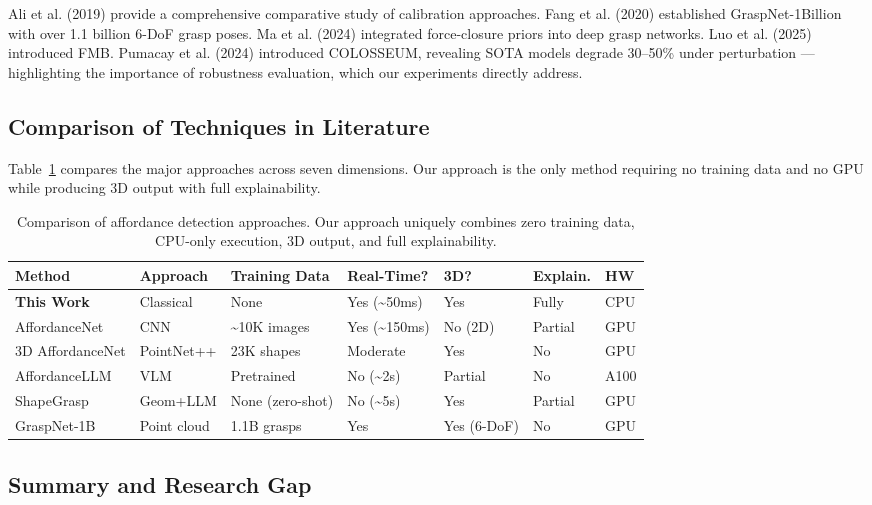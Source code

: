 \documentclass[11pt,a4paper]{article}
\begin{document}
Ali et al. (2019) provide a comprehensive comparative study of calibration approaches. Fang et al. (2020) established GraspNet-1Billion with over 1.1 billion 6-DoF grasp poses. Ma et al. (2024) integrated force-closure priors into deep grasp networks. Luo et al. (2025) introduced FMB. Pumacay et al. (2024) introduced COLOSSEUM, revealing SOTA models degrade 30--50\% under perturbation --- highlighting the importance of robustness evaluation, which our experiments directly address.

\subsection{Comparison of Techniques in Literature}

Table~\ref{tab:lit_comparison} compares the major approaches across seven dimensions. Our approach is the only method requiring no training data and no GPU while producing 3D output with full explainability.

\begin{table}[H]
\centering
\caption{Comparison of affordance detection approaches. Our approach uniquely combines zero training data, CPU-only execution, 3D output, and full explainability.}
\label{tab:lit_comparison}
\small
\begin{tabularx}{\textwidth}{l l X l l l l}
\toprule
\textbf{Method} & \textbf{Approach} & \textbf{Training Data} & \textbf{Real-Time?} & \textbf{3D?} & \textbf{Explain.} & \textbf{HW} \\
\midrule
\textbf{This Work} & Classical & None & Yes (\textasciitilde50ms) & Yes & Fully & CPU \\
AffordanceNet & CNN & \textasciitilde10K images & Yes (\textasciitilde150ms) & No (2D) & Partial & GPU \\
3D AffordanceNet & PointNet++ & 23K shapes & Moderate & Yes & No & GPU \\
AffordanceLLM & VLM & Pretrained & No (\textasciitilde2s) & Partial & No & A100 \\
ShapeGrasp & Geom+LLM & None (zero-shot) & No (\textasciitilde5s) & Yes & Partial & GPU \\
GraspNet-1B & Point cloud & 1.1B grasps & Yes & Yes (6-DoF) & No & GPU \\
\bottomrule
\end{tabularx}
\end{table}

\subsection{Summary and Research Gap}
\end{document}
